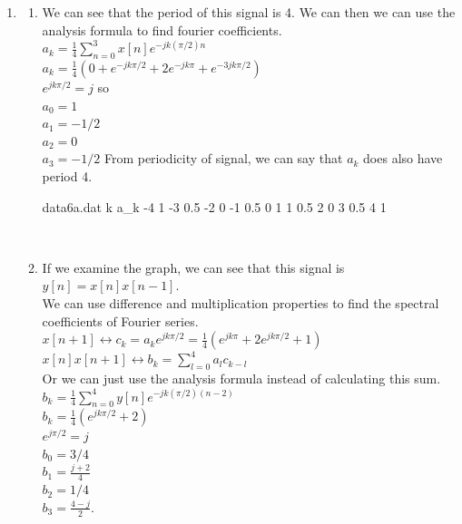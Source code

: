 \documentclass[10pt,a4paper, margin=1in]{article}
\begin{document}
\begin{enumerate}
\item %
    \begin{enumerate}
    \item We can see that the period of this signal is 4. We can then we can use the analysis formula to find fourier coefficients.\\ 
    $a_k = \frac{1}{4}\sum\limits_{n=0}^{3}x[n]e^{-jk(\pi/2)n}$\\
    $a_k = \frac{1}{4}(0+e^{-jk\pi/2} + 2e^{-jk\pi} + e^{-3jk\pi/2})$ \\
    $e^{jk\pi/2} = j$ so\\
    $a_0 = 1$\\
    $a_1 = -1/2$\\
    $a_2 = 0$\\
    $a_3 = -1/2$
    From periodicity of signal, we can say that $a_k$ does also have period 4.\\
    \begin{filecontents}{data6a.dat}
        k    a_k
        -4   1
        -3   0.5
        -2   0
        -1   0.5
        0    1
        1    0.5
        2    0
        3    0.5
        4    1
    \end{filecontents}\\
    \item If we examine the graph, we can see that this signal is $y[n] = x[n]x[n-1]$.\\
    We can use difference and multiplication properties to find the spectral coefficients of Fourier series. \\
    $x[n+1] \leftrightarrow c_k = a_ke^{jk\pi/2} = \frac{1}{4}(e^{jk\pi}+2e^{jk\pi/2}+1)$\\
    $x[n]x[n+1] \leftrightarrow b_k=\sum\limits_{l=0}^4 a_lc_{k-l}$\\
    Or we can just use the analysis formula instead of calculating this sum.\\
    $b_k = \frac{1}{4}\sum\limits_{n=0}^4y[n]e^{-jk(\pi/2)(n-2)}$\\
    $b_k = \frac{1}{4}(e^{jk\pi/2}+2)$\\
    $e^{j\pi/2} = j$\\
    $b_0 = 3/4$\\
    $b_1 = \frac{j+2}{4}$\\
    $b_2 = 1/4$\\
    $b_3= \frac{4-j}{2}$.


\end{enumerate}
\end{enumerate}
\end{document}

